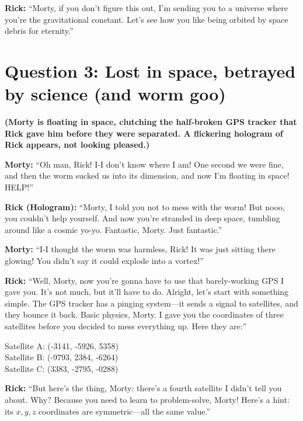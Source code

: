 \documentclass[a4paper, 12pt]{exam}
\begin{document}
\bigskip

\noindent \textbf{Rick:} “Morty, if you don’t figure this out, I’m sending you to a universe where you’re the gravitational constant. Let’s see how you like being orbited by space debris for eternity.”

	
	\pagebreak
	

\section*{Question 3: Lost in space, betrayed by science (and worm goo)}

\noindent \textbf{(Morty is floating in space, clutching the half-broken GPS tracker that Rick gave him before they were separated. A flickering hologram of Rick appears, not looking pleased.)}

\bigskip
\noindent \textbf{Morty:} “Oh man, Rick! I-I don’t know where I am! One second we were fine, and then the worm sucked us into its dimension, and now I’m floating in space! HELP!” \bigskip

\noindent \textbf{Rick (Hologram):} “Morty, I told you not to mess with the worm! But nooo, you couldn’t help yourself. And now you’re stranded in deep space, tumbling around like a cosmic yo-yo. Fantastic, Morty. Just fantastic.” \bigskip

\noindent \textbf{Morty:} “I-I thought the worm was harmless, Rick! It was just sitting there glowing! You didn’t say it could explode into a vortex!” 

\bigskip

\noindent \textbf{Rick:} “Well, Morty, now you’re gonna have to use that barely-working GPS I gave you. It’s not much, but it’ll have to do. Alright, let’s start with something simple. The GPS tracker has a pinging system—it sends a signal to satellites, and they bounce it back. Basic physics, Morty. I gave you the coordinates of three satellites before you decided to mess everything up. Here they are:”

\begin{center}
Satellite A: (-3141, -5926, 5358) \\
Satellite B: (-9793, 2384, -6264) \\
Satellite C: (3383, -2795, -0288)
\end{center}

\noindent \textbf{Rick:} “But here’s the thing, Morty: there’s a fourth satellite I didn’t tell you about. Why? Because you need to learn to problem-solve, Morty! Here’s a hint: its \(x, y, z\) coordinates are symmetric—all the same value.” 
\end{document}
